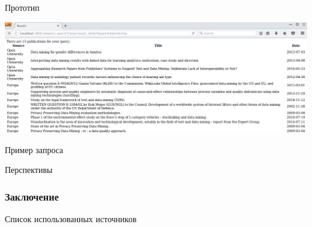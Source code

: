 \documentclass{beamer}
\begin{document}
	\begin{frame}{Прототип}
		 \begin{center}
		 	\includegraphics[scale=0.23]{results.png}  
		 \end{center}
	\end{frame}	
	\begin{frame}{Пример запроса}
		\begin{center}
		 
		\end{center}
	\end{frame}
	
	\begin{frame}{Перспективы}
	\end{frame}
	
	\begin{frame}
		\frametitle{Заключение}
	\end{frame}	
	
	\begin{frame}{Список использованных источников}
	\end{frame}
\end{document}
